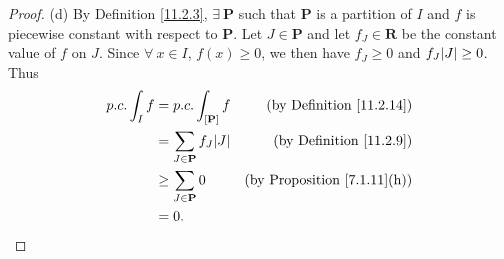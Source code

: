 \begin{proof}{(d)}
    By Definition \ref{11.2.3}, \(\exists\ \mathbf{P}\) such that \(\mathbf{P}\) is a partition of \(I\) and \(f\) is piecewise constant with respect to \(\mathbf{P}\).
    Let \(J \in \mathbf{P}\) and let \(f_J \in \mathbf{R}\) be the constant value of \(f\) on \(J\).
    Since \(\forall\ x \in I\), \(f(x) \geq 0\), we then have \(f_J \geq 0\) and \(f_J \abs*{J} \geq 0\).
    Thus
    \begin{align*}
        p.c. \int_I f & = p.c. \int_{[\mathbf{P}]} f           & \text{(by Definition \ref{11.2.14})}    \\
                      & = \sum_{J \in \mathbf{P}} f_J \abs*{J} & \text{(by Definition \ref{11.2.9})}     \\
                      & \geq \sum_{J \in \mathbf{P}} 0         & \text{(by Proposition \ref{7.1.11}(h))} \\
                      & = 0.
    \end{align*}
\end{proof}